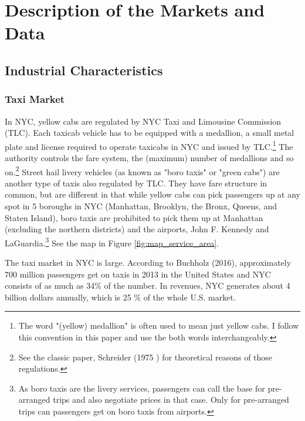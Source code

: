\vspace{1.0cm}
\section{Description of the Markets and Data}
\subsection{Industrial Characteristics}
\subsubsection{Taxi Market}
\hspace{0.5cm} In NYC, yellow cabs are regulated by NYC Taxi and Limousine Commission (TLC). Each taxicab vehicle has to be equipped with a medallion, a small metal plate and license required to operate taxicabs in NYC and issued by TLC.\footnote{The word "(yellow) medallion" is often used to mean just yellow cabs. I follow this convention in this paper and use the both words interchangeably.} The authority controls the fare system, the (maximum) number of medallions and so on.\footnote{See the classic paper, Schreider (1975 \cite{shreiber1975economic}) for theoretical reasons of those regulations.}  Street hail livery vehicles (as known as "boro taxis" or "green cabs") are another type of taxis also regulated by TLC. They have fare structure in common, but are different in that while yellow cabs can pick passengers up at any spot in 5 boroughs in NYC (Manhattan, Brooklyn, the Bronx, Queens, and Staten Island), boro taxis are prohibited to pick them up at Manhattan (excluding the northern districts) and the airports, John F. Kennedy and LaGuardia.\footnote{As boro taxis are the livery services, passengers can call the base for pre-arranged trips and also negotiate prices in that case. Only for pre-arranged trips can passengers get on boro taxis from airports.} See the map in Figure \ref{fig:map_service_area}.

The taxi market in NYC is large. According to Buchholz (2016), approximately 700 million passengers get on taxis in 2013 in the United States and NYC consists of as much as 34\% of the number. In revenues, NYC generates about 4 billion dollars annually, which is 25 \% of the whole U.S. market.

